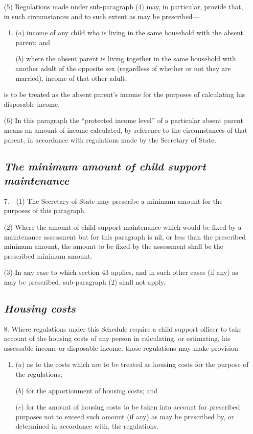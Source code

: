 \documentclass[12pt,a4paper]{article}
\begin{document}
(5) Regulations made under sub-paragraph (4)  may, in particular, provide that, in such circumstances and to such extent as may be prescribed—
\begin{enumerate}\item[]
($a$) income of any child who is living in the same household with the absent parent; and

($b$) where the absent parent is living together in the same household with another adult of the opposite sex (regardless of whether or not they are married), income of that other adult,
\end{enumerate}
is to be treated as the absent parent’s income for the purposes of calculating his disposable income.

(6) In this paragraph the “protected income level” of a particular absent parent means an amount of income calculated, by reference to the circumstances of that parent, in accordance with regulations made by the Secretary of State.


\subsection*{\itshape The minimum amount of child support maintenance}

7.---(1) The Secretary of State may prescribe a minimum amount for the purposes of this paragraph.

(2) Where the amount of child support maintenance which would be fixed by a maintenance assessment but for this paragraph is nil, or less than the prescribed minimum amount, the amount to be fixed by the assessment shall be the prescribed minimum amount.

(3) In any case to which section 43 applies, and in such other cases (if any) as may be prescribed, sub-paragraph (2)  shall not apply.

\subsection*{\itshape Housing costs}

8. Where regulations under this Schedule require a child support officer to take account of the housing costs of any person in calculating, or estimating, his assessable income or disposable income, those regulations may make provision—
\begin{enumerate}\item[]
($a$) as to the costs which are to be treated as housing costs for the purpose of the regulations;

($b$) for the apportionment of housing costs; and

($c$) for the amount of housing costs to be taken into account for prescribed purposes not to exceed such amount (if any) as may be prescribed by, or determined in accordance with, the regulations.
\end{enumerate}
\end{document}
